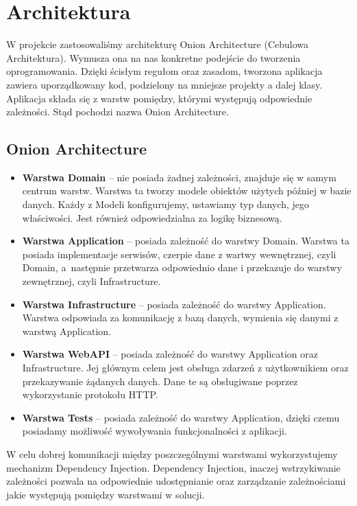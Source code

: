 \documentclass[a4paper,twoside,12pt]{book}
\begin{document}
\section{Architektura}
W projekcie zastosowaliśmy architekturę Onion Architecture (Cebulowa Architektura). Wymusza ona na nas konkretne podejście do tworzenia oprogramowania. Dzięki ścisłym regułom oraz zasadom, tworzona aplikacja zawiera uporządkowany kod, podzielony na mniejsze projekty a dalej klasy. Aplikacja składa się z warstw pomiędzy, którymi występują odpowiednie zależności. Stąd pochodzi nazwa Onion Architecture.

\subsection{Onion Architecture}
\begin{itemize}
    \item \textbf{Warstwa Domain} -- nie posiada żadnej zależności, znajduje się w samym centrum warstw. Warstwa ta tworzy modele obiektów użytych później w bazie danych. Każdy z Modeli konfigurujemy, ustawiamy typ danych, jego właściwości. Jest również odpowiedzialna za logikę biznesową. 
    \item \textbf{Warstwa Application} -- posiada zależność do warstwy Domain. Warstwa ta posiada implementacje serwisów, czerpie dane z wartwy wewnętrznej, czyli Domain, a~następnie przetwarza odpowiednio dane i przekazuje do warstwy zewnętrznej, czyli Infrastructure. 
    \item \textbf{Warstwa Infrastructure} -- posiada zależność do warstwy Application. Warstwa odpowiada za komunikację z bazą danych, wymienia się danymi z warstwą Application. 
    \item \textbf{Warstwa WebAPI} -- posiada zależność do warstwy Application oraz Infrastructure. Jej głównym celem jest obsługa zdarzeń z użytkownikiem oraz przekazywanie żądanych danych. Dane te są obsługiwane poprzez wykorzystanie protokołu HTTP. 
    \item \textbf{Warstwa Tests} -- posiada zależność do warstwy Application, dzięki czemu posiadamy możliwość wywoływania funkcjonalności z aplikacji. 
\end{itemize}

W celu dobrej komunikacji między poszczególnymi warstwami wykorzystujemy mechanizm Dependency Injection. Dependency Injection, inaczej wstrzykiwanie zależności pozwala na odpowiednie udostępnianie oraz zarządzanie zależnościami jakie występują pomiędzy warstwami w solucji. 
\end{document}

